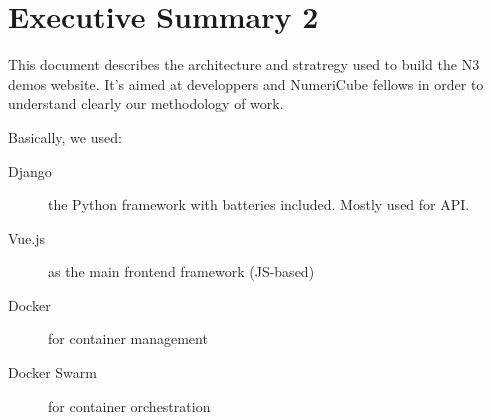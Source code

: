 
\chapter*{Executive Summary 2}
This document describes the architecture and stratregy used to build the N3 demos website.
It's aimed at developpers and NumeriCube fellows in order to understand clearly our methodology of work.

Basically, we used:
\begin{description}
\item[Django] the Python framework with batteries included. Mostly used for API.
\item[Vue.js] as the main frontend framework (JS-based)
\item[Docker] for container management
\item[Docker Swarm] for container orchestration
\end{description}

\cleardoublepage %
